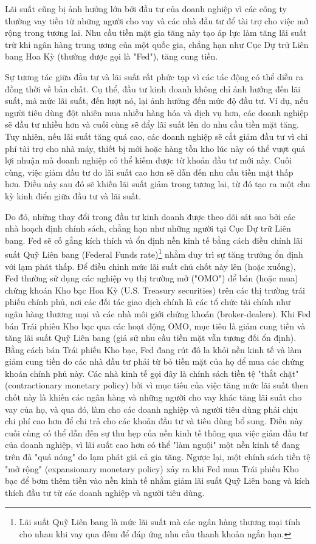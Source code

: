 Lãi suất cũng bị ảnh hưởng lớn bởi đầu tư của doanh nghiệp vì các công ty thường vay tiền từ những người cho vay và các nhà đầu tư để tài trợ cho việc mở rộng trong tương lai. Nhu cầu tiền mặt gia tăng này tạo áp lực làm tăng lãi suất trừ khi ngân hàng trung ương của một quốc gia, chẳng hạn như Cục Dự trữ Liên bang Hoa Kỳ (thường được gọi là "Fed"), tăng cung tiền.

Sự tương tác giữa đầu tư và lãi suất rất phức tạp vì các tác động có thể diễn ra đồng thời về bản chất. Cụ thể, đầu tư kinh doanh không chỉ ảnh hưởng đến lãi suất, mà mức lãi suất, đến lượt nó, lại ảnh hưởng đến mức độ đầu tư. Ví dụ, nếu người tiêu dùng đột nhiên mua nhiều hàng hóa và dịch vụ hơn, các doanh nghiệp sẽ đầu tư nhiều hơn và cuối cùng sẽ đẩy lãi suất lên do nhu cầu tiền mặt tăng. Tuy nhiên, nếu lãi suất tăng quá cao, các doanh nghiệp sẽ cắt giảm đầu tư vì chi phí tài trợ cho nhà máy, thiết bị mới hoặc hàng tồn kho lúc này có thể vượt quá lợi nhuận mà doanh nghiệp có thể kiếm được từ khoản đầu tư mới này. Cuối cùng, việc giảm đầu tư do lãi suất cao hơn sẽ dẫn đến nhu cầu tiền mặt thấp hơn. Điều này sau đó sẽ khiến lãi suất giảm trong tương lai, từ đó tạo ra một chu kỳ kinh điển giữa đầu tư và lãi suất.

Do đó, những thay đổi trong đầu tư kinh doanh được theo dõi sát sao bởi các nhà hoạch định chính sách, chẳng hạn như những người tại Cục Dự trữ Liên bang. Fed sẽ cố gắng kích thích và ổn định nền kinh tế bằng cách điều chỉnh lãi suất Quỹ Liên bang (Federal Funds rate)\footnote{Lãi suất Quỹ Liên bang là mức lãi suất mà các ngân hàng thương mại tính cho nhau khi vay qua đêm để đáp ứng nhu cầu thanh khoản ngắn hạn.} nhằm duy trì sự tăng trưởng ổn định với lạm phát thấp. Để điều chỉnh mức lãi suất chủ chốt này lên (hoặc xuống), Fed thường sử dụng các nghiệp vụ thị trường mở ("OMO") để bán (hoặc mua) chứng khoán Kho bạc Hoa Kỳ (U.S. Treasury securities) trên các thị trường trái phiếu chính phủ, nơi các đối tác giao dịch chính là các tổ chức tài chính như ngân hàng thương mại và các nhà môi giới chứng khoán (broker-dealers). Khi Fed bán Trái phiếu Kho bạc qua các hoạt động OMO, mục tiêu là giảm cung tiền và tăng lãi suất Quỹ Liên bang (giả sử nhu cầu tiền mặt vẫn tương đối ổn định). Bằng cách bán Trái phiếu Kho bạc, Fed đang rút đô la khỏi nền kinh tế và làm giảm cung tiền do các nhà đầu tư phải từ bỏ tiền mặt của họ để mua các chứng khoán chính phủ này. Các nhà kinh tế gọi đây là chính sách tiền tệ "thắt chặt" (contractionary monetary policy) bởi vì mục tiêu của việc tăng mức lãi suất then chốt này là khiến các ngân hàng và những người cho vay khác tăng lãi suất cho vay của họ, và qua đó, làm cho các doanh nghiệp và người tiêu dùng phải chịu chi phí cao hơn để chi trả cho các khoản đầu tư và tiêu dùng bổ sung. Điều này cuối cùng có thể dẫn đến sự thu hẹp của nền kinh tế thông qua việc giảm đầu tư của doanh nghiệp, vì lãi suất cao hơn có thể "làm nguội" một nền kinh tế đang trên đà "quá nóng" do lạm phát giá cả gia tăng. Ngược lại, một chính sách tiền tệ "mở rộng" (expansionary monetary policy) xảy ra khi Fed mua Trái phiếu Kho bạc để bơm thêm tiền vào nền kinh tế nhằm giảm lãi suất Quỹ Liên bang và kích thích đầu tư từ các doanh nghiệp và người tiêu dùng.

